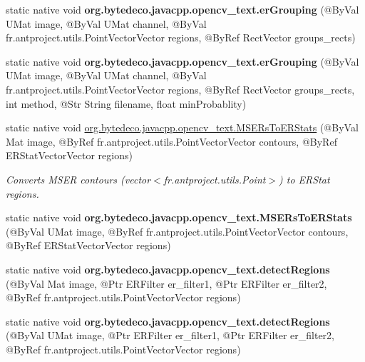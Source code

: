 \begin{DoxyCompactItemize}
static native void {\bfseries org.\+bytedeco.\+javacpp.\+opencv\+\_\+text.\+er\+Grouping} (@By\+Val U\+Mat image, @By\+Val U\+Mat channel, @By\+Val fr.antproject.utils.Point\+Vector\+Vector regions, @By\+Ref Rect\+Vector groups\+\_\+rects)
\item 
\mbox{\label{group__text__detect_ga5e8cf9156f672403885fcc631f91870c}} 
static native void {\bfseries org.\+bytedeco.\+javacpp.\+opencv\+\_\+text.\+er\+Grouping} (@By\+Val U\+Mat image, @By\+Val U\+Mat channel, @By\+Val fr.antproject.utils.Point\+Vector\+Vector regions, @By\+Ref Rect\+Vector groups\+\_\+rects, int method, @Str String filename, float min\+Probablity)
\item 
static native void \hyperlink{group__text__detect_gad4c72b60ca712eeab78c52b946f649a2}{org.\+bytedeco.\+javacpp.\+opencv\+\_\+text.\+M\+S\+E\+Rs\+To\+E\+R\+Stats} (@By\+Val Mat image, @By\+Ref fr.antproject.utils.Point\+Vector\+Vector contours, @By\+Ref E\+R\+Stat\+Vector\+Vector regions)
\begin{DoxyCompactList}\small\item\em Converts M\+S\+ER contours (vector$<$fr.antproject.utils.Point$>$) to E\+R\+Stat regions. \end{DoxyCompactList}\item
\mbox{\label{group__text__detect_ga1188e2750096a4f93afad0c0cf931762}} 
static native void {\bfseries org.\+bytedeco.\+javacpp.\+opencv\+\_\+text.\+M\+S\+E\+Rs\+To\+E\+R\+Stats} (@By\+Val U\+Mat image, @By\+Ref fr.antproject.utils.Point\+Vector\+Vector contours, @By\+Ref E\+R\+Stat\+Vector\+Vector regions)
\item 
\mbox{\label{group__text__detect_ga82e531b1f0fa6fd05234127fd1b43005}} 
static native void {\bfseries org.\+bytedeco.\+javacpp.\+opencv\+\_\+text.\+detect\+Regions} (@By\+Val Mat image, @Ptr E\+R\+Filter er\+\_\+filter1, @Ptr E\+R\+Filter er\+\_\+filter2, @By\+Ref fr.antproject.utils.Point\+Vector\+Vector regions)
\item 
\mbox{\label{group__text__detect_ga87f7f3a3bb00c8f7d14a61b3873d8dbc}} 
static native void {\bfseries org.\+bytedeco.\+javacpp.\+opencv\+\_\+text.\+detect\+Regions} (@By\+Val U\+Mat image, @Ptr E\+R\+Filter er\+\_\+filter1, @Ptr E\+R\+Filter er\+\_\+filter2, @By\+Ref fr.antproject.utils.Point\+Vector\+Vector regions)
\end{DoxyCompactItemize}
